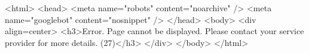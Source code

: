 <html>
<head>
<meta name="robots" content="noarchive" />
<meta name="googlebot" content="nosnippet" />
</head>
<body>
<div align=center>
<h3>Error. Page cannot be displayed. Please contact your service provider for more details.  (27)</h3>
</div>
</body>
</html>